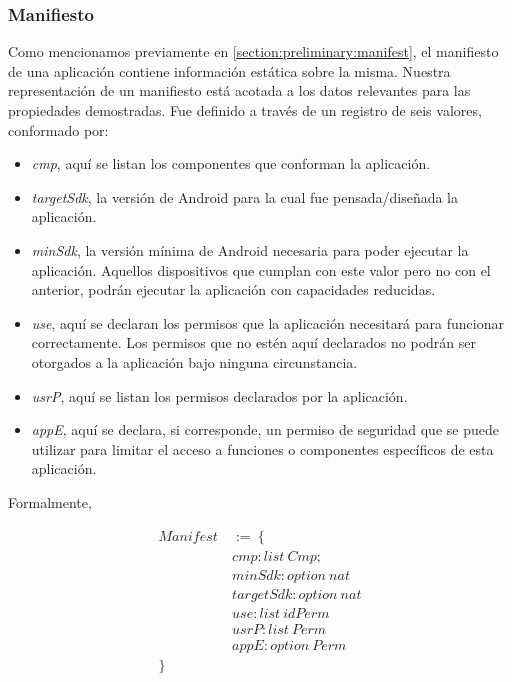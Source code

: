 \subsubsection*{Manifiesto}
Como mencionamos previamente en \ref{section:preliminary:manifest}, el manifiesto de una aplicación
contiene información estática sobre la misma. Nuestra representación de un manifiesto está acotada a
los datos relevantes para las propiedades demostradas. Fue definido a través de un registro de seis
valores, conformado por:

\begin{itemize}
    \item \textit{cmp}, aquí se listan los componentes que conforman la aplicación.
    \item \textit{targetSdk}, la versión de Android para la cual fue pensada/diseñada la aplicación.
    \item \textit{minSdk}, la versión mínima de Android necesaria para poder ejecutar la aplicación.
          Aquellos dispositivos que cumplan con este valor pero no con el anterior, podrán ejecutar
          la aplicación con capacidades reducidas.
    \item \textit{use}, aquí se declaran los permisos que la aplicación necesitará para funcionar
          correctamente. Los permisos que no estén aquí declarados no podrán ser otorgados a la
          aplicación bajo ninguna circunstancia.
    \item \textit{usrP}, aquí se listan los permisos declarados por la aplicación.
    \item \textit{appE}, aquí se declara, si corresponde, un permiso de seguridad que se puede
          utilizar para limitar el acceso a funciones o componentes específicos de esta aplicación.
\end{itemize}

Formalmente,

\begin{align*}
    Manifest\  & :=\ \{                 \\
               & cmp: list\ Cmp;        \\
               & minSdk: option\ nat    \\
               & targetSdk: option\ nat \\
               & use: list\ idPerm      \\
               & usrP: list\ Perm       \\
               & appE: option\ Perm     \\
    \}
\end{align*}

